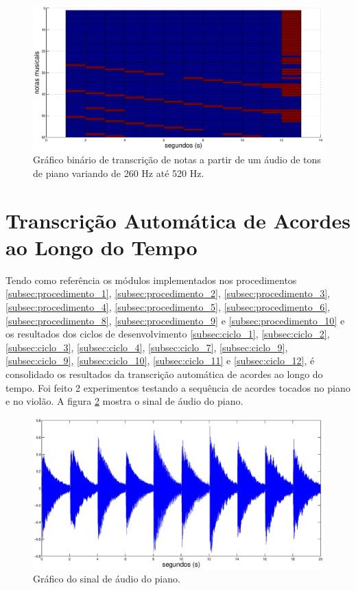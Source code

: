 \begin{figure}[h]
    \centering
    \includegraphics[keepaspectratio=true,scale=0.5]{figuras/notas_piano.eps}
  \caption{Gráfico binário de transcrição de notas a partir de um áudio de tons de piano variando de 260 Hz até 520 Hz.}
  \label{fig:notas_piano}
\end{figure}


\section{Transcrição Automática de Acordes ao Longo do Tempo}
Tendo como referência os módulos implementados nos procedimentos \ref{subsec:procedimento_1}, \ref{subsec:procedimento_2}, \ref{subsec:procedimento_3}, \ref{subsec:procedimento_4}, \ref{subsec:procedimento_5}, \ref{subsec:procedimento_6}, \ref{subsec:procedimento_8}, \ref{subsec:procedimento_9} e \ref{subsec:procedimento_10} e os resultados dos ciclos de desenvolvimento \ref{subsec:ciclo_1}, \ref{subsec:ciclo_2}, \ref{subsec:ciclo_3}, \ref{subsec:ciclo_4}, \ref{subsec:ciclo_7}, \ref{subsec:ciclo_9}, \ref{subsec:ciclo_9}, \ref{subsec:ciclo_10}, \ref{subsec:ciclo_11} e \ref{subsec:ciclo_12}, é consolidado os resultados da transcrição automática de acordes ao longo do tempo. Foi feito 2 experimentos testando a sequência de acordes tocados no piano e no violão. A figura \ref{fig:acordes_piano} mostra o sinal de áudio do piano.

\begin{figure}[h]
    \centering
    \includegraphics[keepaspectratio=true,scale=0.3]{figuras/acordes_piano.eps}
  \caption{Gráfico do sinal de áudio do piano.}
  \label{fig:acordes_piano}
\end{figure}



